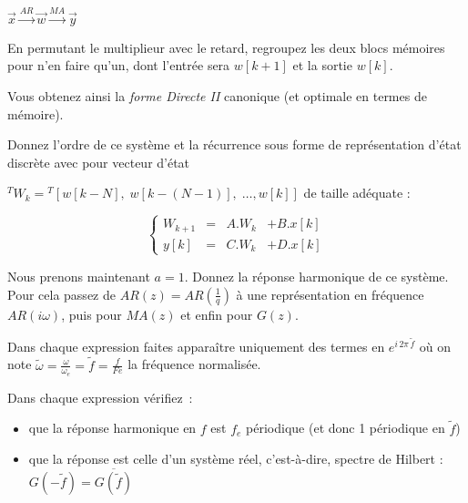 $\vec{x} \overset{AR}{\longrightarrow} \vec{w} \overset{MA}{\longrightarrow} \vec{y}$


En permutant le multiplieur avec le retard, regroupez les deux blocs mémoires pour n'en faire qu'un, dont l'entrée sera $w[k+1]$ et la sortie $w[k]$. 


Vous obtenez ainsi la \emph{forme Directe II} canonique (et optimale en termes de mémoire).


Donnez l'ordre de ce système et la récurrence sous forme de
représentation d'état discrète avec pour vecteur d'état

${}^T\!W_k = {}^T\![w[k-N], \;w[k-(N-1)], \;\ldots, w[k]]$ de taille adéquate :  

\begin{equation*}
  \left\{
    \begin{array}{cccc}
      W_{k+1} &=& A . W_k &+ B. x[k] \\
      y[k] &=& C . W_k &+  D. x[k]
    \end{array}\right.
\end{equation*}



Nous prenons maintenant $a=1$. Donnez la réponse harmonique de ce
système. Pour cela passez de $AR(z)=AR(\frac{1}{q})$ à une
représentation en fréquence $AR(i\omega)$, puis pour $MA(z)$ et enfin
pour $G(z)$.
 

Dans chaque expression faites apparaître uniquement des termes en $e^{i\,2\pi\,\tilde{f}}$ où on note $\tilde{\omega}=\frac{\omega}{\omega_e}=\tilde{f}=\frac{f}{Fe}$ la fréquence normalisée.


Dans chaque expression vérifiez~:  
\begin{itemize}
 \item que la réponse harmonique en $f$ est $f_e$ périodique (et donc 1 périodique en $\tilde{f}$)
 \item que la réponse est celle d'un système réel, c'est-à-dire, spectre de Hilbert : $G(-\tilde{f})=\overline{G(\tilde{f})}$
 \end{itemize}

